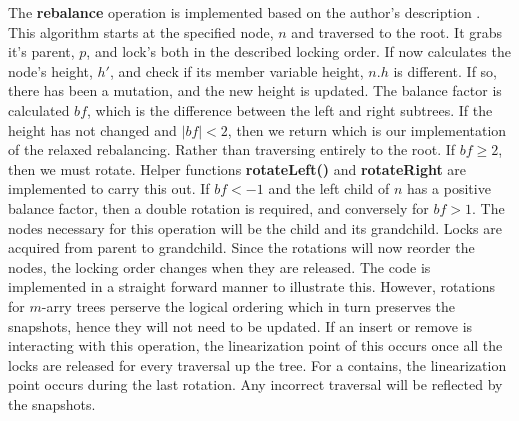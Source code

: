 \documentclass[conference]{IEEEtran}
\makeatletter
\theoremstyle{definition}
\theoremstyle{theorem}
\newenvironment{breakablealgorithm}
  {%
   \begin{center}
     \refstepcounter{algorithm}%
     \hrule height.8pt depth0pt \kern2pt%
     \renewcommand{\caption}[2][\relax]{%
       {\raggedright\textbf{\ALG@name~\thealgorithm} ##2\par}%
       \ifx\relax##1\relax %
         \addcontentsline{loa}{algorithm}{\protect\numberline{\thealgorithm}##2}%
       \else %
         \addcontentsline{loa}{algorithm}{\protect\numberline{\thealgorithm}##1}%
       \fi
       \kern2pt\hrule\kern2pt
     }
  }{%
     \kern2pt\hrule\relax%
   \end{center}
  }
\makeatother
\begin{document}
The \textbf{rebalance} operation is implemented based on the author's description \cite{pavt}. This algorithm starts at the specified node, $n$ and traversed to the root. It grabs it's parent, $p$, and lock's both in the described locking order. If now calculates the node's height, $h'$, and check if its member variable height, $n.h$ is different. If so, there has been a mutation, and the new height is updated. The balance factor is calculated $bf$, which is the difference between the left and right subtrees. If the height has not changed and $|bf|<2$, then we return which is our implementation of the relaxed rebalancing. Rather than traversing entirely to the root. If $bf\geq 2$, then we must rotate. Helper functions \textbf{rotateLeft()} and \textbf{rotateRight} are implemented to carry this out. If $bf<-1$ and the left child of $n$ has a positive balance factor, then a double rotation is required, and conversely for $bf>1$. The nodes necessary for this operation will be the child and its grandchild. Locks are acquired from parent to grandchild. Since the rotations will now reorder the nodes, the locking order changes when they are released. The code is implemented in a straight forward manner to illustrate this. However, rotations for $m$-arry trees perserve the logical ordering which in turn preserves the snapshots, hence they will not need to be updated. If an insert or remove is interacting with this operation, the linearization point of this occurs once all the locks are released for every traversal up the tree. For a contains, the linearization point occurs during the last rotation. Any incorrect traversal will be reflected by the snapshots.
%
\end{document}

